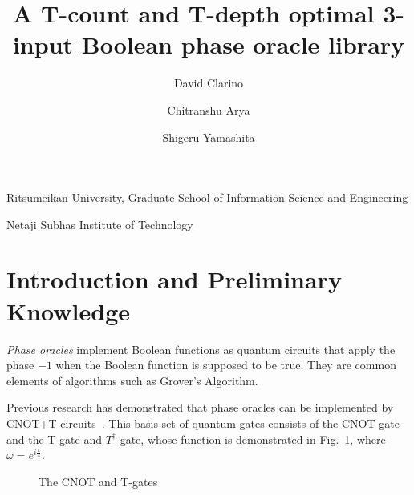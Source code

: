 \documentclass[a4paper]{article}
\makeatletter
\newcommand{\sublabel}[1]{\protected@edef\@currentlabel{\thefigure(\thesubfigure)}\label{#1}}
\makeatother
\begin{document}
\title{
   A T-count and T-depth optimal 3-input Boolean phase oracle library
}

\author{
  David Clarino
  \and
  Chitranshu Arya
  \and
 Shigeru Yamashita
  }
  
\address{1}{
  Ritsumeikan University, Graduate School of Information Science and Engineering
}
\address{2}{
  Netaji Subhas Institute of Technology
}





\maketitle


\section{Introduction and Preliminary Knowledge}
{\it Phase oracles} implement Boolean functions as quantum circuits that apply the phase $-1$
when the Boolean function is supposed to be true. They are common elements of algorithms such
as Grover's Algorithm.

Previous research has demonstrated that phase oracles can be implemented by CNOT+T circuits~\cite{bib-amy-cnot}.
This basis set of quantum gates consists of the CNOT gate and the T-gate and $T^{\dagger}$-gate,
whose function is demonstrated in Fig.~\ref{fig-gates}, where $\omega = e^{i\frac{\pi}{4}}$.

\begin{figure}[t]
    \centering
    \scalebox{1.0}{
      
    }
    \sublabel{fig-cnot}
    \centering
    \scalebox{1.0} {
      
    }
    \sublabel{fig-tgate}
    \scalebox{1.0} {
      
    }
    \sublabel{fig-tdgate}
  \caption{The CNOT and T-gates}
  \label{fig-gates}
\end{figure}
\end{document}
